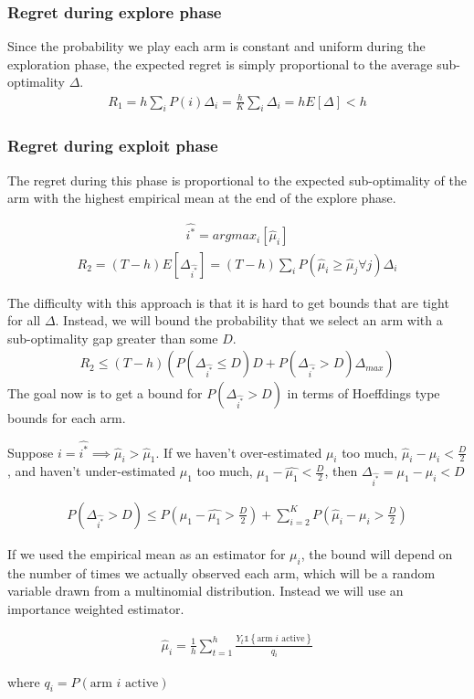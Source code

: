 \documentclass{article}
\newcommand{\set}[1]{\left\{#1\right\}}
\newcommand{\ind}[1]{\mathds{1}\!\!\set{#1}}
\newcommand{\eqn}[1]{\begin{align}#1\end{align}}
\theoremstyle{plain}
\theoremstyle{definition}
\begin{document}
\subsubsection*{Regret during explore phase}
Since the probability we play each arm is constant and uniform during the exploration phase, the expected regret is simply proportional to the average sub-optimality $\Delta$.
\eqn{
R_1 = h\sum_i P(i)\Delta_i = \frac{h}{K}\sum_i \Delta_i = h E[\Delta] < h
}

\subsubsection*{Regret during exploit phase}
The regret during this phase is proportional to the expected sub-optimality of the arm with the highest empirical mean at the end of the explore phase.

\eqn{
\hat{i^*} = argmax_i [\hat{\mu}_i]
}
\eqn{
R_2 = (T-h)E[\Delta_{\hat{i^*}}] = (T-h)\sum_i P(\hat{\mu}_i \geq \hat{\mu}_j \forall j)\Delta_i 
}

The difficulty with this approach is that it is hard to get bounds that are tight for all $\Delta$. Instead, we will bound the probability that we select an arm with a sub-optimality gap greater than some $D$.
\eqn{
R_2 \leq (T-h)\left(P(\Delta_{\hat{i^*}} \leq D) D+P(\Delta_{\hat{i^*}} > D)  \Delta_{max} \right)
}
The goal now is to get a bound for $P(\Delta_{\hat{i^*}} > D)$ in terms of Hoeffdings type bounds for each arm. 

Suppose $i = \hat{i^*} \implies \hat{\mu}_i > \hat{\mu}_1$. If we haven't over-estimated $\mu_i$ too much, $\hat{\mu}_i - \mu_{i} < \frac{D}{2}$, and haven't under-estimated $\mu_1$ too much, $\mu_1 - \hat{\mu_1} < \frac{D}{2}$, then $\Delta_{\hat{i^*}} = \mu_1 - \mu_i < D$

\eqn{
\label{eqn:probDeltaToLarge}
P(\Delta_{\hat{i^*}} > D) \leq  P(\mu_1 - \hat{\mu_1} > \frac{D}{2})+ \sum_{i=2}^K P(\hat{\mu}_i - \mu_{i} > \frac{D}{2})
}

If we used the empirical mean as an estimator for $\mu_i$, the bound will depend on the number of times we actually observed each arm, which will be a random variable drawn from a multinomial distribution. Instead we will use an importance weighted estimator.

\eqn{
\label{eqn:importance_weighted_estimator}
\hat{\mu}_i = \frac{1}{h}\sum_{t=1}^h \frac{Y_t\ind{\text{arm $i$ active}}}{q_i}
}

where $q_i = P(\text{arm $i$ active})$
\end{document}
